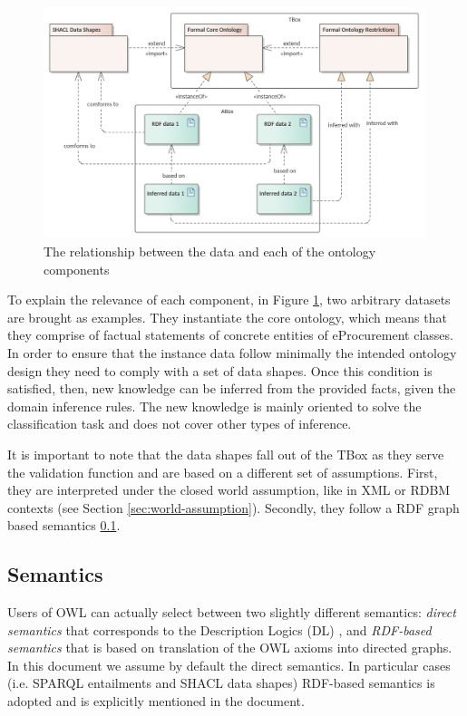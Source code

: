 	\begin{figure}[!ht]
		\centering
		\includegraphics[width=0.99\textwidth]{../img/ontology.png}
		\caption{The relationship between the data and each of the ontology components}
		\label{fig:abox-tbox}
	\end{figure}
	
	To explain the relevance of each component, in Figure \ref{fig:abox-tbox}, two arbitrary datasets are brought as examples. They instantiate the core ontology, which means that they comprise of factual statements of concrete entities of eProcurement classes. In order to ensure that the instance data follow minimally the intended ontology design they need to comply with a set of data shapes. Once this condition is satisfied, then, new knowledge can be inferred from the provided facts, given the domain inference rules. The new knowledge is mainly oriented to solve the classification task and does not cover other types of inference. 	
	
	It is important to note that the data shapes fall out of the TBox as they serve the validation function and are based on a different set of assumptions. First, they are interpreted under the closed world assumption, like in XML  or RDBM contexts (see Section \ref{sec:world-assumption}). Secondly, they follow a RDF graph based semantics \ref{sec:semantics}.

	\subsection{Semantics}
	\label{sec:semantics}
	
	Users of OWL \citep{owl2} can actually select between two slightly different semantics: \textit{direct semantics} that corresponds to the Description Logics (DL) \cite{dl-baader2004description}, and \textit{RDF-based semantics} that is based on translation of the OWL axioms into directed graphs. In this document we assume by default the direct semantics. In particular cases (i.e. SPARQL entailments and SHACL data shapes) RDF-based semantics is adopted and is explicitly mentioned in the document. 
	
